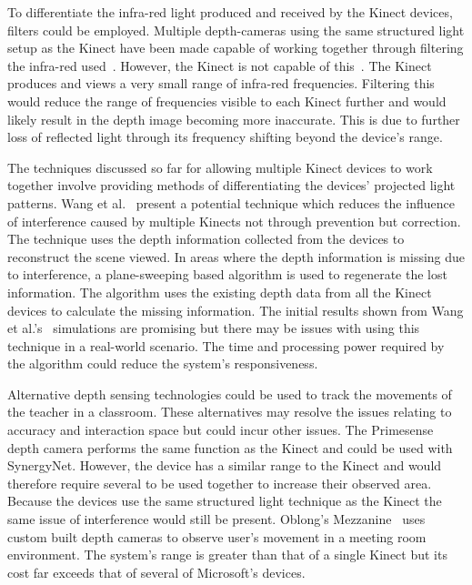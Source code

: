 \documentclass[link]{IWCOMP}
\begin{document}
To differentiate the infra-red light produced and received by the Kinect devices, filters could be employed.
Multiple depth-cameras using the same structured light setup as the Kinect have been made capable of working together through filtering the infra-red used~\cite{Kim2008}.
However, the Kinect is not capable of this~\cite{Kainz2012}.
The Kinect produces and views a very small range of infra-red frequencies.
Filtering this would reduce the range of frequencies visible to each Kinect further and would likely result in the depth image becoming more inaccurate.
This is due to further loss of reflected light through its frequency shifting beyond the device's range.

The techniques discussed so far for allowing multiple Kinect devices to work together involve providing methods of differentiating the devices' projected light patterns.
Wang et al.~\cite{Wang2012} present a potential technique which reduces the influence of interference caused by multiple Kinects not through prevention but correction.
The technique uses the depth information collected from the devices to reconstruct the scene viewed.
In areas where the depth information is missing due to interference, a plane-sweeping based algorithm is used to regenerate the lost information.
The algorithm uses the existing depth data from all the Kinect devices to calculate the missing information.
The initial results shown from Wang et al.'s~\cite{Wang2012} simulations are promising but there may be issues with using this technique in a real-world scenario.
The time and processing power required by the algorithm could reduce the system's responsiveness.

Alternative depth sensing technologies could be used to track the movements of the teacher in a classroom.
These alternatives may resolve the issues relating to accuracy and interaction space but could incur other issues.
The Primesense~\cite{Wilson2010} depth camera performs the same function as the Kinect and could be used with SynergyNet.
However, the device has a similar range to the Kinect and would therefore require several to be used together to increase their observed area.
Because the devices use the same structured light technique as the Kinect the same issue of interference would still be present.
Oblong's Mezzanine~\cite{kramer2011} uses custom built depth cameras to observe user's movement in a meeting room environment.
The system's range is greater than that of a single Kinect but its cost far exceeds that of several of Microsoft's devices.
\end{document}
